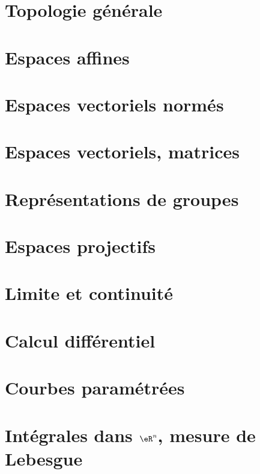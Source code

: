 \chapter{Topologie générale}


\chapter{Espaces affines}


\chapter{Espaces vectoriels normés}


\chapter{Espaces vectoriels, matrices}



\chapter{Représentations de groupes}


\chapter{Espaces projectifs}


\chapter{Limite et continuité}


\chapter{Calcul différentiel}


\chapter{Courbes paramétrées}           \label{Chap_courbes}


\chapter{Intégrales dans \texorpdfstring{$\eR^n$}{Rn}, mesure de Lebesgue}


